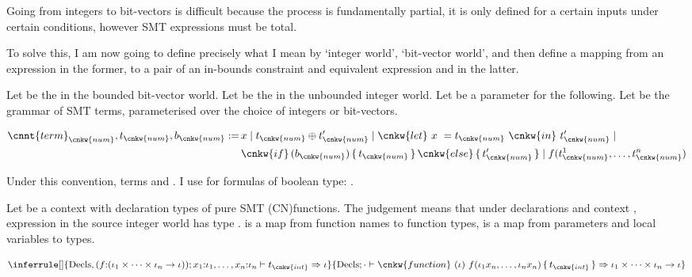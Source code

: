 Going from integers to bit-vectors is difficult because the process is
fundamentally partial, \ie{} it is only defined for a certain inputs under
certain conditions, however SMT expressions must be total.

To solve this, I am now going to define precisely what I mean by `integer
world', `bit-vector world', and then define a mapping from an expression in the
former, to a pair of an in-bounds constraint and equivalent expression and in
the latter.

Let \sm{\beta} be the  in the bounded bit-vector world. Let \sm{\iota}
be the  in the unbounded integer world. Let  be a parameter for the following.
Let  be the grammar of SMT terms,
parameterised over the choice of integers or bit-vectors.

{\small%
\begin{align*}
\cnnt{term}_{\cnkw{num}}, t_{\cnkw{num}}, b_{\cnkw{num}} \mathrel{{:}{=}}
\, & x \mid t_{\cnkw{num}} \oplus t'_{\cnkw{num}} \mid
\cnkw{let}\ x\ = t_{\cnkw{num}}\ \cnkw{in}\ t'_{\cnkw{num}} \mid \\
& \cnkw{if} \, (b_{\cnkw{num}}) \,\{\, t_{\cnkw{num}} \,\}\, \cnkw{else} \,\{\, t'_{\cnkw{num}} \,\} \mid
f(t^1_{\cnkw{num}}, \ldots, t^n_{\cnkw{num}})
\end{align*}}

Under this convention, terms  and
. I use  for formulas of boolean type:
.

Let  be a context with declaration types of pure SMT \kl(CN){functions}. The judgement
  means that
under declarations  and context \sm{\Gamma}, expression in the
source integer world  has type \sm{\iota}.  is a
map from function names to function types, \sm{\Gamma} is a map from parameters
and local variables to types.

{\small%
\[
\inferrule[]
  { \mathrm{Decls} , ( f {:} ( \iota_1 \times \cdots \times \iota_n \rightarrow \iota ) ) ; x_1 {:} \iota_1 , \ldots , x_n {:} \iota_n \vdash t_{\cnkw{int}} \Rightarrow \iota }
  { \mathrm{Decls} ; \cdot \vdash \cnkw{function}\ (\iota)\ f(\iota_1 x_n, \ldots, \iota_n x_n) \, \{ \, t_{\cnkw{int}} \,\} \Rightarrow \iota_1 \times \cdots \times \iota_n \rightarrow \iota }
\]}


